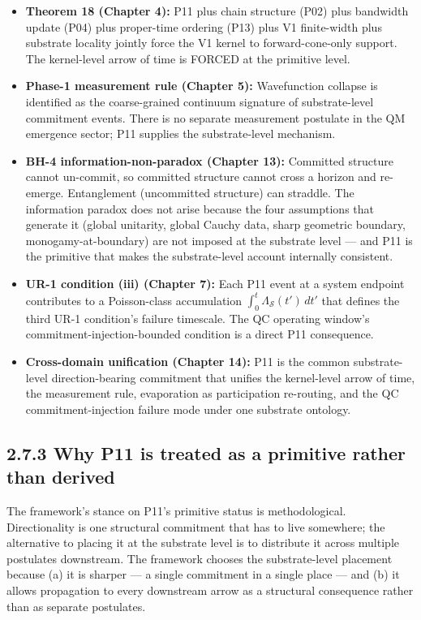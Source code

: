 \documentclass[11pt]{book}
\begin{document}
\begin{itemize}
\item \textbf{Theorem 18 (Chapter 4):} P11 plus chain structure (P02) plus bandwidth update (P04) plus proper-time ordering (P13) plus V1 finite-width plus substrate locality jointly force the V1 kernel to forward-cone-only support. The kernel-level arrow of time is FORCED at the primitive level.
\item \textbf{Phase-1 measurement rule (Chapter 5):} Wavefunction collapse is identified as the coarse-grained continuum signature of substrate-level commitment events. There is no separate measurement postulate in the QM emergence sector; P11 supplies the substrate-level mechanism.
\item \textbf{BH-4 information-non-paradox (Chapter 13):} Committed structure cannot un-commit, so committed structure cannot cross a horizon and re-emerge. Entanglement (uncommitted structure) can straddle. The information paradox does not arise because the four assumptions that generate it (global unitarity, global Cauchy data, sharp geometric boundary, monogamy-at-boundary) are not imposed at the substrate level — and P11 is the primitive that makes the substrate-level account internally consistent.
\item \textbf{UR-1 condition (iii) (Chapter 7):} Each P11 event at a system endpoint contributes to a Poisson-class accumulation $\int_0^t \Lambda_\mathcal{S}(t')\,dt'$ that defines the third UR-1 condition's failure timescale. The QC operating window's commitment-injection-bounded condition is a direct P11 consequence.
\item \textbf{Cross-domain unification (Chapter 14):} P11 is the common substrate-level direction-bearing commitment that unifies the kernel-level arrow of time, the measurement rule, evaporation as participation re-routing, and the QC commitment-injection failure mode under one substrate ontology.
\end{itemize}

\subsection{2.7.3 Why P11 is treated as a primitive rather than derived}

The framework's stance on P11's primitive status is methodological. Directionality is one structural commitment that has to live somewhere; the alternative to placing it at the substrate level is to distribute it across multiple postulates downstream. The framework chooses the substrate-level placement because (a) it is sharper — a single commitment in a single place — and (b) it allows propagation to every downstream arrow as a structural consequence rather than as separate postulates.
\end{document}
